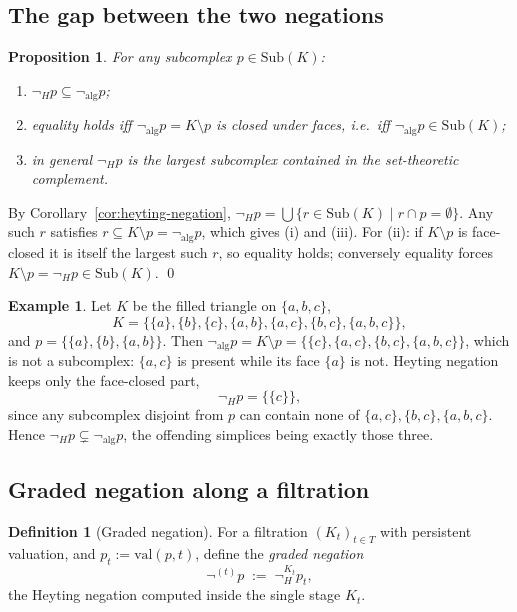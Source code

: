 \documentclass[final,12pt]{elsarticle}
\theoremstyle{plain}
\newtheorem{prop}[thm]{Proposition}
\theoremstyle{definition}
\newtheorem{defi}[thm]{Definition}
\newtheorem{exa}[thm]{Example}
\begin{document}
\subsection{The gap between the two negations}
\label{subsec:negation-gap}

\begin{prop}
\label{prop:negation-gap}
For any subcomplex \(p\in\mathrm{Sub}(K)\):
\begin{enumerate}
  \item \(\neg_H p \subseteq \neg_{\mathrm{alg}} p\);
  \item equality holds iff \(\neg_{\mathrm{alg}} p = K\setminus p\) is closed
  under faces, i.e.\ iff \(\neg_{\mathrm{alg}} p\in\mathrm{Sub}(K)\);
  \item in general \(\neg_H p\) is the largest subcomplex contained in the
  set-theoretic complement.
\end{enumerate}
\end{prop}

\proof
By Corollary~\ref{cor:heyting-negation},
\(\neg_H p=\bigcup\{r\in\mathrm{Sub}(K)\mid r\cap p=\emptyset\}\).  Any such
\(r\) satisfies \(r\subseteq K\setminus p=\neg_{\mathrm{alg}}p\), which gives
(i) and (iii).  For (ii): if \(K\setminus p\) is face-closed it is itself the
largest such \(r\), so equality holds; conversely equality forces
\(K\setminus p=\neg_H p\in\mathrm{Sub}(K)\).
\qed

\begin{exa}
\label{ex:negation-gap}
Let \(K\) be the filled triangle on \(\{a,b,c\}\),
\[
K=\bigl\{\{a\},\{b\},\{c\},\{a,b\},\{a,c\},\{b,c\},\{a,b,c\}\bigr\},
\]
and \(p=\{\{a\},\{b\},\{a,b\}\}\).  Then
\(\neg_{\mathrm{alg}}p=K\setminus p=\{\{c\},\{a,c\},\{b,c\},\{a,b,c\}\}\),
which is not a subcomplex: \(\{a,c\}\) is present while its face \(\{a\}\) is
not.  Heyting negation keeps only the face-closed part,
\[
\neg_H p=\bigl\{\{c\}\bigr\},
\]
since any subcomplex disjoint from \(p\) can contain none of
\(\{a,c\},\{b,c\},\{a,b,c\}\).  Hence
\(\neg_H p\subsetneq\neg_{\mathrm{alg}}p\), the offending simplices being
exactly those three.
\end{exa}

\subsection{Graded negation along a filtration}
\label{subsec:graded-negation}

\begin{defi}[Graded negation]
\label{def:graded-negation}
For a filtration \((K_t)_{t\in T}\) with persistent valuation, and
\(p_t:=\mathrm{val}(p,t)\), define the \emph{graded negation}
\[
  \neg^{(t)}p \;:=\; \neg_H^{K_t}p_t,
\]
the Heyting negation computed inside the single stage \(K_t\).
\end{defi}
\end{document}
